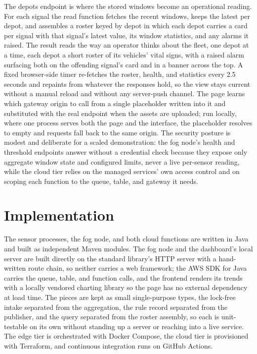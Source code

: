 \documentclass[conference]{IEEEtran}
\begin{document}
The depots endpoint is where the stored windows become an operational reading. For each signal the read function fetches the recent windows, keeps the latest per depot, and assembles a roster keyed by depot in which each depot carries a card per signal with that signal's latest value, its window statistics, and any alarms it raised. The result reads the way an operator thinks about the fleet, one depot at a time, each depot a short roster of its vehicles' vital signs, with a raised alarm surfacing both on the offending signal's card and in a banner across the top. A fixed browser-side timer re-fetches the roster, health, and statistics every 2.5 seconds and repaints from whatever the responses hold, so the view stays current without a manual reload and without any server-push channel. The page learns which gateway origin to call from a single placeholder written into it and substituted with the real endpoint when the assets are uploaded; run locally, where one process serves both the page and the interface, the placeholder resolves to empty and requests fall back to the same origin. The security posture is modest and deliberate for a scaled demonstration: the fog node's health and threshold endpoints answer without a credential check because they expose only aggregate window state and configured limits, never a live per-sensor reading, while the cloud tier relies on the managed services' own access control and on scoping each function to the queue, table, and gateway it needs.

\section{Implementation}

The sensor processes, the fog node, and both cloud functions are written in Java and built as independent Maven modules. The fog node and the dashboard's local server are built directly on the standard library's HTTP server with a hand-written route chain, so neither carries a web framework; the AWS SDK for Java carries the queue, table, and function calls, and the frontend renders its trends with a locally vendored charting library so the page has no external dependency at load time. The pieces are kept as small single-purpose types, the lock-free intake separated from the aggregation, the rule record separated from the publisher, and the query separated from the roster assembly, so each is unit-testable on its own without standing up a server or reaching into a live service. The edge tier is orchestrated with Docker Compose, the cloud tier is provisioned with Terraform, and continuous integration runs on GitHub Actions.
\end{document}
